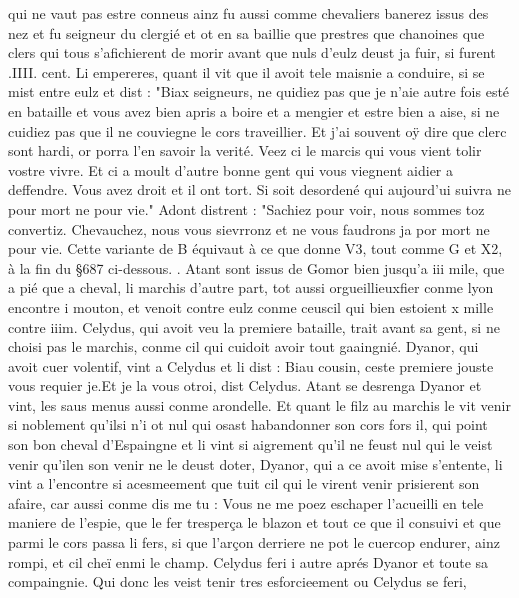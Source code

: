\documentclass{article}
\begin{document}
\begin{pages}
   qui ne vaut pas estre conneus ainz fu aussi comme chevaliers banerez issus des nez et fu seigneur du clergié et ot en sa baillie
   que prestres que chanoines que clers qui tous s'afichierent de morir avant que nuls d'eulz deust ja fuir, si furent .IIII. cent.
   Li empereres, quant il vit que il avoit tele maisnie a conduire, si se mist entre eulz et dist : "Biax seigneurs, ne quidiez pas
   que je n'aie autre fois esté en bataille et vous avez bien apris a boire et a mengier et estre bien a aise, si ne cuidiez pas 
   que il ne couviegne le cors traveillier. Et j'ai souvent oÿ dire que clerc sont hardi, or porra l'en savoir la verité. Veez ci
   le marcis qui vous vient tolir vostre vivre. Et ci a moult d'autre bonne gent qui vous viegnent aidier a deffendre. Vous avez droit
   et il ont tort. Si soit desordené qui aujourd'ui suivra ne pour mort ne pour vie." Adont distrent : "Sachiez pour voir, 
   nous sommes toz convertiz. Chevauchez, nous vous sievrronz et ne vous faudrons ja por mort ne pour vie.
      Cette variante de B équivaut à ce que donne V3, tout comme G et X2, à la fin du §687 ci-dessous.
      . 
   Atant sont issus de Gomor bien jusqu’a 
   iii mile, que a pié que a cheval, li marchis d’autre part, 
   tot aussi orgueillieuxfier conme lyon encontre 
   i mouton, 
   et venoit contre eulz conme ceuscil qui bien estoient 
   x mille contre iiim.
   Celydus, qui avoit veu la premiere bataille, trait avant sa gent, 
   si ne choisi pas le marchis, conme cil qui cuidoit avoir tout gaaingnié. \pend
\pstart Dyanor, qui avoit cuer volentif, 
   vint a Celydus et li dist :
   Biau cousin, ceste premiere jouste vous requier je.Et je la vous otroi, dist Celydus.
   Atant se desrenga Dyanor et vint, les saus menus aussi conme arondelle. 
   Et quant le filz au marchis le vit venir si noblement 
   qu’ilsi n’i ot nul qui osast habandonner 
   son cors fors il, qui point son bon cheval 
   d’Espaingne et li vint si aigrement qu'il ne feust nul qui 
   le veist venir qu'ilen son venir ne le deust doter, 
   Dyanor, qui a ce avoit mise s’entente, 
   li vint a l’encontre si acesmeement que tuit cil qui le virent venir 
   prisierent son afaire, car aussi conme dis me tu : Vous ne me poez 
      eschaper l’acueilli en tele maniere de l’espie, 
   que le fer tresperça le blazon et tout ce que il consuivi et que parmi le cors passa li fers, 
   si que l’arçon derriere ne pot le cuercop endurer, ainz rompi, 
   et cil cheï enmi le champ. Celydus feri 
   i autre aprés Dyanor 
   et toute sa compaingnie. Qui donc les veist tenir tres esforcieement ou Celydus se feri, 

\end{pages}
\end{document}
